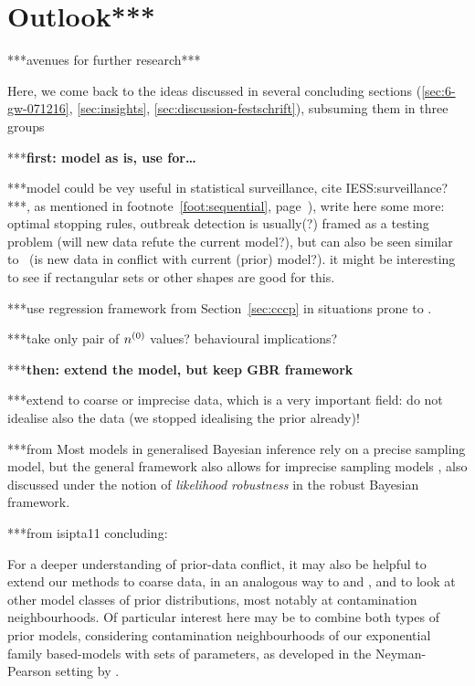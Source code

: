 \section{Outlook***}
\label{sec:concluding-outlook}

***avenues for further research***

Here, we come back to the ideas discussed in several concluding sections
(\ref{sec:6-gw-071216}, \ref{sec:insights}, \ref{sec:discussion-festschrift}),
subsuming them in three groups

***\textbf{first: model as is, use for\dots }

***model could be vey useful in statistical surveillance, cite IESS:surveillance?***,
as mentioned in footnote~\ref{foot:sequential}, page~\pageref{foot:sequential}),
write here some more: optimal stopping rules, outbreak detection is usually(?)
framed as a testing problem (will new data refute the current model?),
but can also be seen similar to \pdc\ (is new data in conflict with current (prior) model?).
it might be interesting to see if rectangular sets or other shapes are good for this.  

***use regression framework from Section~\ref{sec:cccp} in situations prone to \pdc.

***take only pair of $n^{(0)}$ values? behavioural implications?


***\textbf{then: extend the model, but keep GBR framework}

***extend to coarse or imprecise data, which is a very important field:
do not idealise also the data (we stopped idealising the prior already)!

***from \textcite[4.4]{itip-statinf}
Most models in generalised Bayesian inference rely on a precise sampling model,
but the general framework also allows for imprecise sampling models \parencite[see, in particular,][\S 8.5]{1991:walley},
also discussed under the notion of \emph{likelihood robustness} \parencite[e.g.,][]{2000:shyamalkumar} in the robust Bayesian framework.


***from isipta11 concluding:
\begin{small}
For a deeper understanding of prior-data conflict, it may also be helpful
to extend our methods to coarse data, in an analogous way to \textcite{2007:utkinaugustin} and
\textcite{2009:Troffaes:Coolen}, and to look at other model classes of prior distributions, most
notably at contamination neighbourhoods. Of particular interest here may
be to combine both types of prior models, considering contamination
neighbourhoods of our exponential family based-models with sets of
parameters, as developed in the Neyman-Pearson setting by
\textcite[\S~5]{2002:augustin}.
\end{small}

